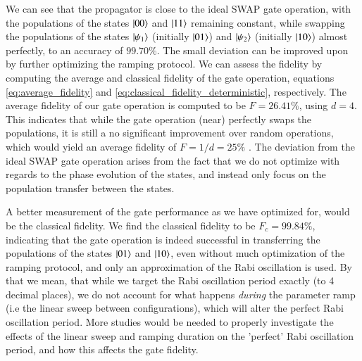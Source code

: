 \documentclass{subfiles}
\begin{document}
We can see that the propagator is close to the ideal SWAP gate operation, with the populations of the states $\ket{00}$ and $\ket{11}$ remaining constant, while swapping the populations of the states $\ket{\psi_1}$  (initially $\ket{01}$) and $\ket{\psi_2}$ (initially $\ket{10}$) almost perfectly, to an accuracy of $99.70\%$. The small deviation can be improved upon by further optimizing the ramping protocol. We can assess the fidelity by computing the average and classical fidelity of the gate operation, equations \eqref{eq:average_fidelity} and \eqref{eq:classical_fidelity_deterministic}, respectively. The average fidelity of our gate operation is computed to be $F = 26.41\%$, using $d=4$. This indicates that while the gate operation (near) perfectly swaps the populations, it is still a no significant improvement over random operations, which would yield an average fidelity of $F = 1/d = 25\%$ \cite{zyczkowski2005average}. The deviation from the ideal SWAP gate operation arises from the fact that we do not optimize with regards to the phase evolution of the states, and instead only focus on the population transfer between the states. 

A better measurement of the gate performance as we have optimized for, would be the classical fidelity. We find the classical fidelity to be $F_c = 99.84\%$, indicating that the gate operation is indeed successful in transferring the populations of the states $\ket{01}$ and $\ket{10}$, even without much optimization of the ramping protocol, and only an approximation of the Rabi oscillation is used. By that we mean, that while we target the Rabi oscillation period exactly (to 4 decimal places), we do not account for what happens \emph{during} the parameter ramp (i.e the linear sweep between configurations), which will alter the perfect Rabi oscillation period. More studies would be needed to properly investigate the effects of the linear sweep and ramping duration on the 'perfect' Rabi oscillation period, and how this affects the gate fidelity.
\end{document}
